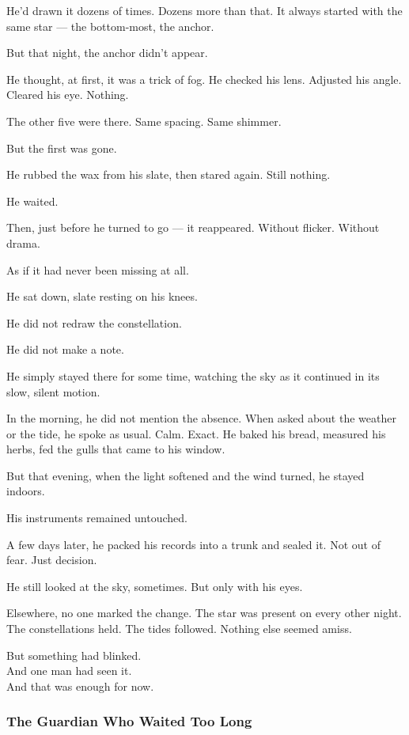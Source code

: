 \documentclass[12pt]{article}
\begin{document}
He’d drawn it dozens of times. Dozens more than that. It always started with the same star — the bottom-most, the anchor.

But that night, the anchor didn’t appear.

He thought, at first, it was a trick of fog. He checked his lens. Adjusted his angle. Cleared his eye. Nothing.

The other five were there. Same spacing. Same shimmer.

But the first was gone.

He rubbed the wax from his slate, then stared again. Still nothing.

He waited.

Then, just before he turned to go — it reappeared. Without flicker. Without drama.

As if it had never been missing at all.

He sat down, slate resting on his knees.

He did not redraw the constellation.

He did not make a note.

He simply stayed there for some time, watching the sky as it continued in its slow, silent motion.

In the morning, he did not mention the absence. When asked about the weather or the tide, he spoke as usual. Calm. Exact. He baked his bread, measured his herbs, fed the gulls that came to his window.

But that evening, when the light softened and the wind turned, he stayed indoors.

His instruments remained untouched.

A few days later, he packed his records into a trunk and sealed it. Not out of fear. Just decision.

He still looked at the sky, sometimes. But only with his eyes.

Elsewhere, no one marked the change. The star was present on every other night. The constellations held. The tides followed. Nothing else seemed amiss.

But something had blinked.\\
And one man had seen it.\\
And that was enough for now.


\dotfill

\subsubsection*{The Guardian Who Waited Too Long}
\end{document}
